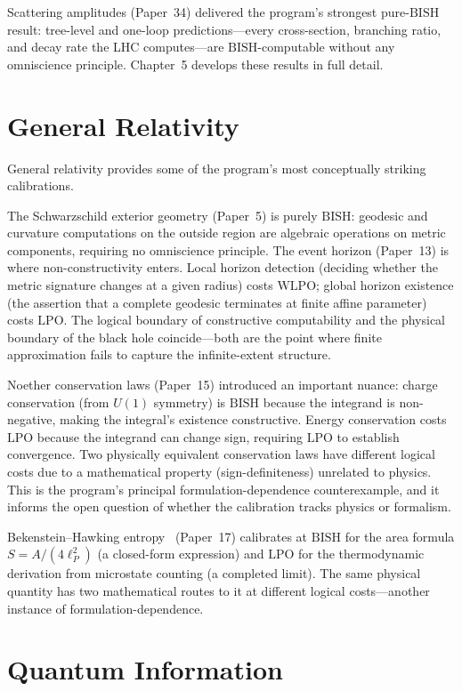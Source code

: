 \documentclass[11pt,a4paper]{report}
\theoremstyle{plain}
\theoremstyle{definition}
\theoremstyle{remark}
\newcommand{\BISH}{\mathrm{BISH}}
\newcommand{\WLPO}{\mathrm{WLPO}}
\newcommand{\LPO}{\mathrm{LPO}}
\begin{document}
Scattering amplitudes (Paper~34) delivered the program's strongest pure-$\BISH$ result: tree-level and one-loop predictions---every cross-section, branching ratio, and decay rate the LHC computes---are $\BISH$-computable without any omniscience principle.  Chapter~5 develops these results in full detail.

\section{General Relativity}

General relativity provides some of the program's most conceptually striking calibrations.

The Schwarzschild exterior geometry (Paper~5) is purely $\BISH$: geodesic and curvature computations on the outside region are algebraic operations on metric components, requiring no omniscience principle.  The event horizon (Paper~13) is where non-constructivity enters.  Local horizon detection (deciding whether the metric signature changes at a given radius) costs $\WLPO$; global horizon existence (the assertion that a complete geodesic terminates at finite affine parameter) costs $\LPO$.  The logical boundary of constructive computability and the physical boundary of the black hole coincide---both are the point where finite approximation fails to capture the infinite-extent structure.

Noether conservation laws (Paper~15) introduced an important nuance: charge conservation (from $U(1)$ symmetry) is $\BISH$ because the integrand is non-negative, making the integral's existence constructive.  Energy conservation costs $\LPO$ because the integrand can change sign, requiring $\LPO$ to establish convergence.  Two physically equivalent conservation laws have different logical costs due to a mathematical property (sign-definiteness) unrelated to physics.  This is the program's principal formulation-dependence counterexample, and it informs the open question of whether the calibration tracks physics or formalism.

Bekenstein--Hawking entropy~\cite{Bekenstein1973,Hawking1975} (Paper~17) calibrates at $\BISH$ for the area formula $S = A/(4\ell_P^2)$ (a closed-form expression) and $\LPO$ for the thermodynamic derivation from microstate counting (a completed limit).  The same physical quantity has two mathematical routes to it at different logical costs---another instance of formulation-dependence.

\section{Quantum Information}
\end{document}
